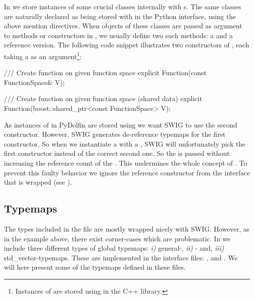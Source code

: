 In \dolfin we store instances of some crucial classes internally with s. The same classes are naturally declared as being stored with  in the Python interface, using the above mention directives. When objects of these classes are passed as argument to methods or constructors in \dolfin, we usually define two such methods: a  and a reference version. The following code snippet illustrates two constructors of , each taking a  as an argument\footnote{Instances of  are stored using  in the \dolfin C++ library.}:
\begin{c++}
/// Create function on given function space
explicit Function(const FunctionSpace& V);

/// Create function on given function space (shared data)
explicit Function(boost::shared_ptr<const FunctionSpace> V);
\end{c++}
As instances of  in PyDolfin are stored using  we want SWIG to use the second constructor. However, SWIG generates de-reference typemaps for the first constructor. So when we instantiate a  with a , SWIG will unfortunately pick the first constructor instead of the correct second one. So the  is passed without increasing the reference count of the . This undermines the whole concept of . To prevent this faulty behavior we ignore the reference constructor from the interface that is wrapped (see ).
\begin{c++}
\end{c++}

\subsection{Typemaps}
The types included in the  file are mostly wrapped nicely with SWIG. However, as in the  example above, there exist corner-cases which are problematic. In  we include three different types of global typemaps: \textit{i)} general-, \textit{ii)} \numpy- and, \textit{iii)} std\_vector-typemaps. These are implemented in the interface files: ,  and . We will here present some of the typemaps defined in these files.\par

